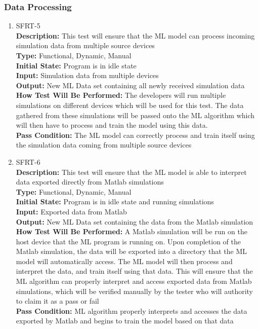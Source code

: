 \documentclass[12pt, titlepage]{article}
\begin{document}
\subsubsection{Data Processing}
\begin{enumerate}
    \hypertarget{SFRT-5Anchor}{}
    \item{SFRT-5\\}
    \textbf{Description:} This test will ensure that the ML model can process incoming simulation data from multiple source devices\\
    \textbf{Type:} Functional, Dynamic, Manual\\
    \textbf{Initial State:} Program is in idle state\\
    \textbf{Input:} Simulation data from multiple devices\\
    \textbf{Output:} New ML Data set containing all newly received simulation data\\
    \textbf{How Test Will Be Performed:} The developers will run multiple simulations on different devices which will be used for this test. The data gathered from these simulations will be passed onto the ML algorithm which will then have to process and train the model using this data.\\
    \textbf{Pass Condition:} The ML model can correctly process and train itself using the simulation data coming from multiple source devices\\

    \item{SFRT-6\\}
    \textbf{Description:} This test will ensure that the ML model is able to interpret data exported directly from Matlab simulations\\
    \textbf{Type:} Functional, Dynamic, Manual\\
    \textbf{Initial State:} Program is in idle state and running simulations\\
    \textbf{Input:} Exported data from Matlab\\
    \textbf{Output:} New ML Data set containing the data from the Matlab simulation\\
    \textbf{How Test Will Be Performed:} A Matlab simulation will be run on the host device that the ML program is running on. Upon completion of the Matlab simulation, the data will be exported into a directory that the ML model will automatically access. The ML model will then process and interpret the data, and train itself using that data. This will ensure that the ML algorithm can properly interpret and access exported data from Matlab simulations, which will be verified manually by the tester who will authority to claim it as a pass or fail\\
    \textbf{Pass Condition:} ML algorithm properly interprets and accesses the data exported by Matlab and begins to train the model based on that data\\
\end{enumerate}
\end{document}
